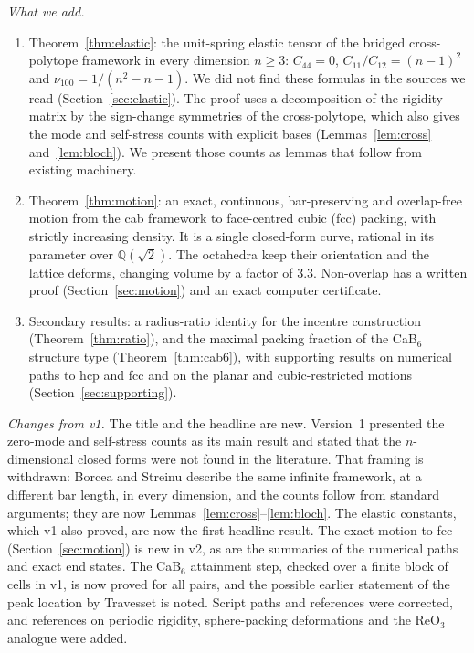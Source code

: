 \documentclass[11pt]{amsart}
\theoremstyle{definition}
\theoremstyle{remark}
\newcommand{\Q}{\mathbb{Q}}
\newcommand{\nus}{\nu_{100}}
\begin{document}
\emph{What we add.}
\begin{enumerate}[leftmargin=2em]
\item Theorem~\ref{thm:elastic}: the unit-spring elastic tensor of the bridged cross-polytope framework in every dimension $n\ge3$: $C_{44}=0$, $C_{11}/C_{12}=(n-1)^2$ and $\nus=1/(n^2-n-1)$. We did not find these formulas in the sources we read (Section~\ref{sec:elastic}). The proof uses a decomposition of the rigidity matrix by the sign-change symmetries of the cross-polytope, which also gives the mode and self-stress counts with explicit bases (Lemmas~\ref{lem:cross} and~\ref{lem:bloch}). We present those counts as lemmas that follow from existing machinery.
\item Theorem~\ref{thm:motion}: an exact, continuous, bar-preserving and overlap-free motion from the \textsf{cab} framework to face-centred cubic (fcc) packing, with strictly increasing density. It is a single closed-form curve, rational in its parameter over $\Q(\sqrt2)$. The octahedra keep their orientation and the lattice deforms, changing volume by a factor of $3.3$. Non-overlap has a written proof (Section~\ref{sec:motion}) and an exact computer certificate.
\item Secondary results: a radius-ratio identity for the incentre construction (Theorem~\ref{thm:ratio}), and the maximal packing fraction of the CaB$_6$ structure type (Theorem~\ref{thm:cab6}), with supporting results on numerical paths to hcp and fcc and on the planar and cubic-restricted motions (Section~\ref{sec:supporting}).
\end{enumerate}

\emph{Changes from v1.} The title and the headline are new. Version~1 presented the zero-mode and self-stress counts as its main result and stated that the $n$-dimensional closed forms were not found in the literature. That framing is withdrawn: Borcea and Streinu \cite[Section~7]{BorceaStreinu2021} describe the same infinite framework, at a different bar length, in every dimension, and the counts follow from standard arguments; they are now Lemmas~\ref{lem:cross}--\ref{lem:bloch}. The elastic constants, which v1 also proved, are now the first headline result. The exact motion to fcc (Section~\ref{sec:motion}) is new in v2, as are the summaries of the numerical paths and exact end states. The CaB$_6$ attainment step, checked over a finite block of cells in v1, is now proved for all pairs, and the possible earlier statement of the peak location by Travesset is noted. Script paths and references were corrected, and references on periodic rigidity, sphere-packing deformations and the ReO$_3$ analogue were added.
\end{document}
